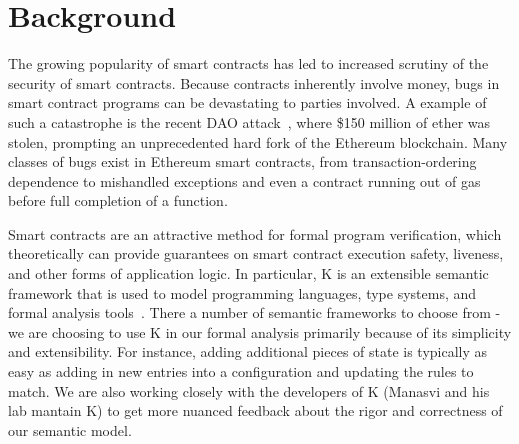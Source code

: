 \section{Background} The growing popularity of smart contracts has led to
increased scrutiny of the security of smart contracts. Because contracts
inherently involve money, bugs in smart contract programs can be devastating to
parties involved. A example of such a catastrophe is the recent DAO
attack~\cite{dao-attack}, where \$150 million of ether was stolen, prompting an
unprecedented hard fork of the Ethereum blockchain. Many classes of bugs exist
in Ethereum smart contracts, from transaction-ordering dependence to mishandled
exceptions and even a contract running out of gas before full completion of a
function.

Smart contracts are an attractive method for formal program verification, which
theoretically can provide guarantees on smart contract execution safety,
liveness, and other forms of application logic. In particular, K is an
extensible semantic framework that is used to model programming languages, type
systems, and formal analysis tools~\cite{rosu-serbanuta-2010-jlap}. There a
number of semantic frameworks to choose from - we are choosing to use K in our
formal analysis primarily because of its simplicity and extensibility. For
instance, adding additional pieces of state is typically as easy as adding in
new entries into a configuration and updating the rules to match. We are also
working closely with the developers of K (Manasvi and his lab mantain K) to get
more nuanced feedback about the rigor and correctness of our semantic model.
